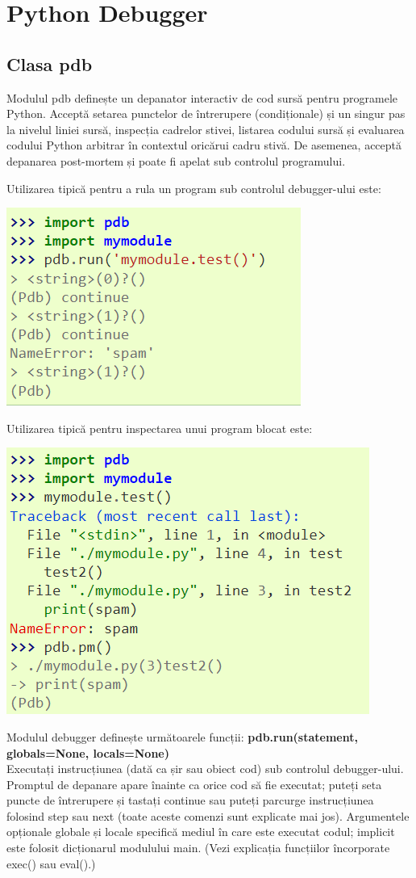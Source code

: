 \documentclass[oneside,20pt]{article}          %
\begin{document}
\section{Python Debugger}
\subsection{Clasa pdb}
Modulul pdb definește un depanator interactiv de cod sursă pentru programele Python. Acceptă setarea punctelor de întrerupere (condiționale) și un singur pas la nivelul liniei sursă, inspecția cadrelor stivei, listarea codului sursă și evaluarea codului Python arbitrar în contextul oricărui cadru stivă. De asemenea, acceptă depanarea post-mortem și poate fi apelat sub controlul programului.

Utilizarea tipică pentru a rula un program sub controlul debugger-ului este:
\begin{center}
\includegraphics[height = 2 cm]{3.png}
\end{center}
Utilizarea tipică pentru inspectarea unui program blocat este:
\begin{center}
\includegraphics[height = 2 cm]{4.png}
\end{center}
Modulul debugger definește următoarele funcții:
\textbf{
pdb.run(statement, globals=None, locals=None)}\\
Executați instrucțiunea (dată ca șir sau obiect cod) sub controlul debugger-ului. Promptul de depanare apare înainte ca orice cod să fie executat; puteți seta puncte de întrerupere și tastați continue sau puteți parcurge instrucțiunea folosind step sau next (toate aceste comenzi sunt explicate mai jos). Argumentele opționale globale și locale specifică mediul în care este executat codul; implicit este folosit dicționarul modulului main. (Vezi explicația funcțiilor încorporate exec() sau eval().)\\
\end{document}

